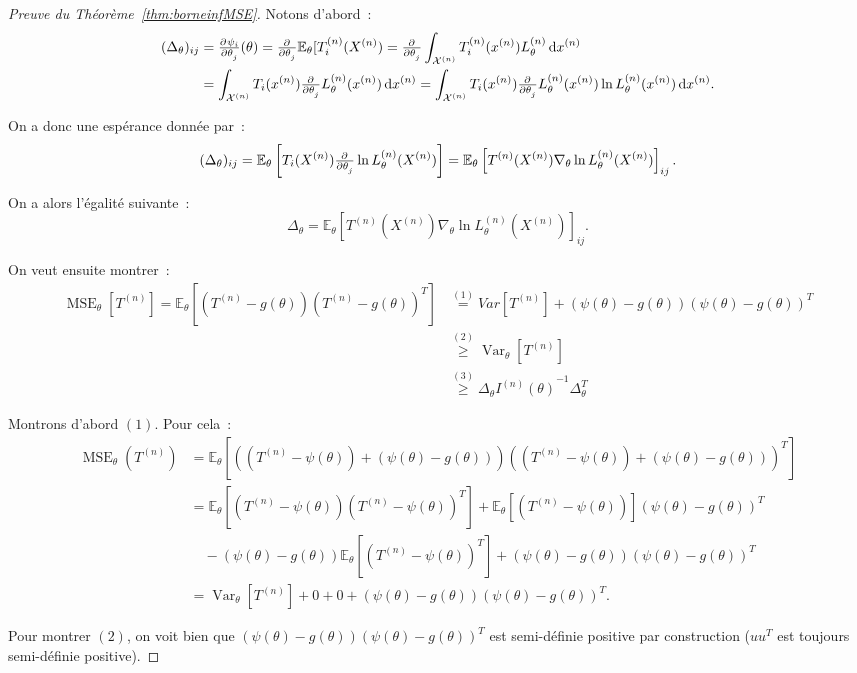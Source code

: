\documentclass{report}
\DeclareMathOperator{\Var}{Var}
\DeclareMathOperator{\MSE}{MSE}
\newcommand{\E}{\mathbb E}
\newcommand{\Xn}{{X^{(n)}}}
\newcommand{\Tn}{{T^{(n)}}}
\newcommand{\TnXn}{{\Tn(\Xn)}}
\theoremstyle{definition}
\theoremstyle{remark}
\begin{document}
			\begin{proof}[Preuve du Théorème~\ref{thm:borneinfMSE}] Notons d'abord~:
			\begin{align*} (\Delta_\theta)_{ij} &= \pd {\psi_i}{\theta_j}(\theta) = \pd {}{\theta_j}\E_\theta[T_i^{(n)}(\Xn)
				= \pd {}{\theta_j}\int_{\mathcal X^{(n)}}T_i^{(n)}(x^{(n)})L_\theta^{(n)}\dif x^{(n)} \\
			&= \int_{\mathcal X^{(n)}}T_i(x^{(n)})\pd {}{\theta_j}L_\theta^{(n)}(x^{(n)})\dif x^{(n)}
				= \int_{\mathcal X^{(n)}}T_i(x^{(n)})\pd {}{\theta_j}L_\theta^{(n)}(x^{(n)})\ln L_\theta^{(n)}(x^{(n)})\dif x^{(n)}.
			\end{align*}

			On a donc une espérance donnée par~:
			\[(\Delta_\theta)_{ij} = \E_\theta\left[T_i(X^{(n)})\pd {}{\theta_j}\ln L_\theta^{(n)}(X^{(n)})\right]
				= \E_\theta\left[\TnXn\nabla_\theta\ln L_\theta^{(n)}(X^{(n)})\right]_{ij}.\]

			On a alors l'égalité suivante~:
			\[\Delta_\theta = \E_\theta\left[\TnXn\nabla_\theta\ln L_\theta^{(n)}(X^{(n)})\right]_{ij}.\]

			On veut ensuite montrer~:
			\begin{align*}
				\MSE_\theta[\Tn] = \E_\theta\left[\left(\Tn - g(\theta)\right)\left(\Tn - g(\theta)\right)^T\right] &\overset {(1)}=
					Var[\Tn] + \left(\psi(\theta)-g(\theta)\right)\left(\psi(\theta)-g(\theta)\right)^T \\
				&\overset{(2)}\geq \Var_\theta[\Tn] \\
				&\overset{(3)}\geq \Delta_\theta{I^{(n)}(\theta)}^{-1}\Delta_\theta^T
			\end{align*}

			Montrons d'abord $(1)$. Pour cela~:
			\begin{align*}
				\MSE_\theta(\Tn) &= \E_\theta\left[\left((\Tn - \psi(\theta)) + (\psi(\theta) - g(\theta))\right)\left((\Tn - \psi(\theta)) + (\psi(\theta) - g(\theta))\right)^T\right] \\
				&=\E_\theta[(\Tn - \psi(\theta))(\Tn - \psi(\theta))^T] + \E_\theta[(\Tn - \psi(\theta))](\psi(\theta) - g(\theta))^T \\
				&\quad- (\psi(\theta) - g(\theta))\E_\theta[(\Tn - \psi(\theta))^T] + (\psi(\theta) - g(\theta))(\psi(\theta) - g(\theta))^T \\
				&= \Var_\theta[\Tn] + 0 + 0 + (\psi(\theta) - g(\theta))(\psi(\theta) - g(\theta))^T.
			\end{align*}

			Pour montrer $(2)$, on voit bien que $(\psi(\theta) - g(\theta))(\psi(\theta) - g(\theta))^T$ est semi-définie positive par construction ($uu^T$ est toujours
			semi-définie positive).


\end{proof}
\end{document}
